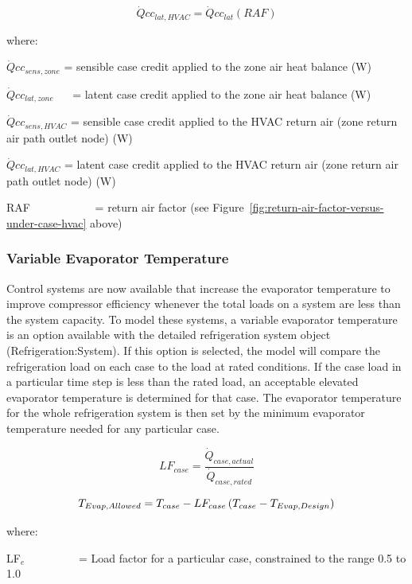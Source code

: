 \begin{equation}
\dot Qc{c_{lat,HVAC}} = \dot Qc{c_{lat}}\left( {RAF} \right)
\end{equation}

where:

\(\dot Qc{c_{sens,zone}}\) = sensible case credit applied to the zone air heat balance (W)

\(\dot Qc{c_{lat,zone}}\) ~~ = latent case credit applied to the zone air heat balance (W)

\(\dot Qc{c_{sens,HVAC}}\) = sensible case credit applied to the HVAC return air (zone return air path outlet node) (W)

\(\dot Qc{c_{lat,HVAC}}\) = latent case credit applied to the HVAC return air (zone return air path outlet node) (W)

RAF~~~~~~~~~~~ = return air factor (see Figure~\ref{fig:return-air-factor-versus-under-case-hvac} above)

\subsubsection{Variable Evaporator Temperature}\label{variable-evaporator-temperature}

Control systems are now available that increase the evaporator temperature to improve compressor efficiency whenever the total loads on a system are less than the system capacity. To model these systems, a variable evaporator temperature is an option available with the detailed refrigeration system object (Refrigeration:System). If this option is selected, the model will compare the refrigeration load on each case to the load at rated conditions. If the case load in a particular time step is less than the rated load, an acceptable elevated evaporator temperature is determined for that case. The evaporator temperature for the whole refrigeration system is then set by the minimum evaporator temperature needed for any particular case.

\begin{equation}
  LF_{case} = \frac{\dot{Q}_{case,actual}}{\dot{Q}_{case,rated}}
\end{equation}

\begin{equation} 
  T_{Evap,Allowed} = T_{case} - LF_{case}\PB{T_{case} - T_{Evap,Design}}
\end{equation}

where:

LF\(_{e}\)~~~~~~~~~ = Load factor for a particular case, constrained to the range 0.5 to 1.0

